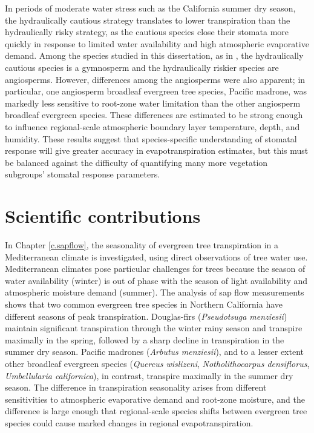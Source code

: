 In periods of moderate water stress such as the California summer dry season, the hydraulically cautious strategy translates to lower transpiration than the hydraulically risky strategy, as the cautious species close their stomata more quickly in response to limited water availability and high atmospheric evaporative demand.  Among the species studied in this dissertation, as in \cite{choat2012global}, the hydraulically cautious species is a gymnosperm and the hydraulically riskier species are angiosperms.  However, differences among the angiosperms were also apparent; in particular, one angiosperm broadleaf evergreen tree species, Pacific madrone, was markedly less sensitive to root-zone water limitation than the other angiosperm broadleaf evergreen species.  These differences are estimated to be strong enough to influence regional-scale atmospheric boundary layer temperature, depth, and humidity.  These results suggest that species-specific understanding of stomatal response will give greater accuracy in evapotranspiration estimates, but this must be balanced against the difficulty of quantifying many more vegetation subgroups' stomatal response parameters.

\section{Scientific contributions}

In Chapter \ref{c.sapflow}, the seasonality of evergreen tree transpiration in a Mediterranean climate is investigated, using direct observations of tree water use. Mediterranean climates pose particular challenges for trees because the season of water availability (winter) is out of phase with the season of light availability and atmospheric moisture demand (summer). The analysis of sap flow measurements shows that two common evergreen tree species in Northern California have different seasons of peak transpiration.  Douglas-firs (\textit{Pseudotsuga menziesii}) maintain significant transpiration through the winter rainy season and transpire maximally in the spring, followed by a sharp decline in transpiration in the summer dry season.  Pacific madrones (\textit{Arbutus menziesii}), and to a lesser extent other broadleaf evergreen species (\textit{Quercus wislizeni}, \textit{Notholithocarpus densiflorus}, \textit{Umbellularia californica}), in contrast, transpire maximally in the summer dry season. The difference in transpiration seasonality arises from different sensitivities to atmospheric evaporative demand and root-zone moisture, and the difference is large enough that regional-scale species shifts between evergreen tree species could cause marked changes in regional evapotranspiration.

